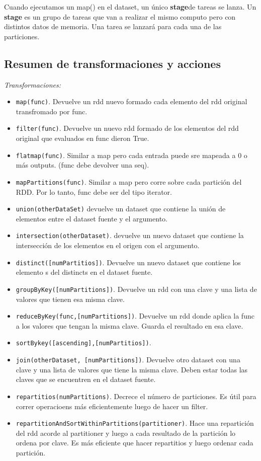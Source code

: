 \documentclass[titlepage,a4paper]{article}
\begin{document}
Cuando ejecutamos un map() en el dataset, un único \textbf{stage}de tareas se lanza. Un \textbf{stage} es un grupo de tareas que van a realizar el mismo computo pero con distintos datos de memoria. Una tarea se lanzará para cada una de las particiones. 




\subsection*{Resumen de transformaciones y acciones}
\textit{Transformaciones:}
\begin{itemize}
\item \texttt{map(func)}. Devuelve un rdd nuevo formado cada elemento del rdd original transfromado por func. 
\item \texttt{filter(func)}. Devuelve un nuevo rdd formado de los elementos del rdd original que evaluados en func dieron True. 
\item \texttt{flatmap(func)}. Similar a map pero cada entrada puede sre mapeada a 0 o más outputs. (func debe devolver una seq). 
\item \texttt{mapPartitions(func)}. Similar a map pero corre sobre cada partición del RDD. Por lo tanto, func debe ser del tipo iterator. 
\item \texttt{union(otherDataSet)} devuelve un dataset que contiene la unión de elementos entre el dataset fuente y el argumento. 
\item \texttt{intersection(otherDataset)}. devuelve un nuevo dataset que contiene la intersección de los elementos en el origen con el argumento. 
\item \texttt{distinct([numPartitios])}. Devuelve un nuevo dataset que contiene los elemento s del distincts en el dataset fuente. 
\item \texttt{groupByKey([numPartitions])}. Devuelve un rdd con una clave y una lista de valores que tienen esa misma clave. 
\item \texttt{reduceByKey(func,[numPartitions])}.  Devuelve un rdd donde aplica la func a los valores que tengan la misma clave. Guarda el resultado en esa clave. 
\item \texttt{sortBykey([ascending],[numPartitios])}. 
\item \texttt{join(otherDataset, [numPartitions])}. Devuelve otro dataset con una clave y una lista de valores que tiene la misma clave. Deben estar todas las claves que se encuentren en el dataset fuente. 
\item \texttt{repartitios(numPartitions)}. Decrece el número de particiones. Es útil para correr operacioens más eficientemente luego de hacer un filter. 
\item \texttt{repartitionAndSortWithinPartitions(partitioner)}. Hace una repartición del rdd acorde al partitioner y luego a cada resultado de la partición lo ordena por clave. Es más eficiente que hacer repartitios y luego ordenar cada partición.  
\end{itemize}
\end{document}
